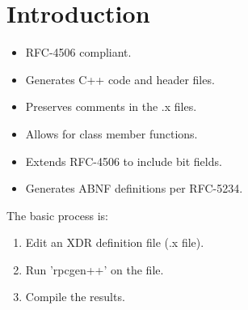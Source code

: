 \section{Introduction}
\begin{itemize}
\item RFC-4506 compliant.
\item Generates C++ code and header files.
\item Preserves comments in the .x files.
\item Allows for class member functions.
\item Extends RFC-4506 to include bit fields.
\item Generates ABNF definitions per RFC-5234.
\end{itemize}
The basic process is:
\begin{enumerate}
\item Edit an XDR definition file (.x file).
\item Run 'rpcgen++' on the file.
\item Compile the results.
\end{enumerate}
